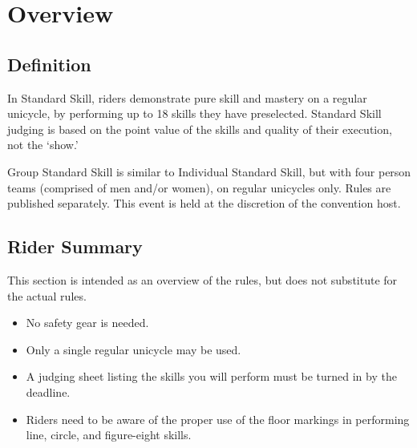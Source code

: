 \chapter{Overview}

\section{Definition}

In Standard Skill, riders demonstrate pure skill and mastery on a regular unicycle, by performing up to 18 skills they have preselected.
Standard Skill judging is based on the point value of the skills and quality of their execution, not the `show.'

Group Standard Skill is similar to Individual Standard Skill, but with four person teams (comprised of men and/or women), on regular unicycles only.
Rules are published separately.
This event is held at the discretion of the convention host.

\section{Rider Summary}

This section is intended as an overview of the rules, but does not
substitute for the actual rules.
\begin{itemize}
\item No safety gear is needed.
\item Only a single regular unicycle may be used.
\item A judging sheet listing the skills you will perform must be turned in by the deadline.
\item Riders need to be aware of the proper use of the floor markings in performing line, circle, and figure-eight skills.
\end{itemize}
